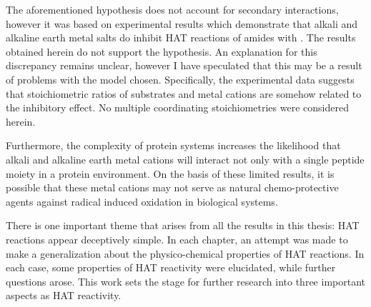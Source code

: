 \begin{doublespace}
The aforementioned hypothesis does not account for secondary interactions,
however it was based on experimental results which demonstrate that alkali and
alkaline earth metal salts do inhibit HAT reactions of amides with \cumo. The
results obtained herein do not support the hypothesis. An explanation for this
discrepancy remains unclear, however I have speculated that this may be a result
of problems with the model chosen. Specifically, the experimental data suggests
that stoichiometric ratios of substrates and metal cations are somehow related
to the inhibitory effect. No multiple coordinating stoichiometries were
considered herein.

Furthermore, the complexity of protein systems increases the likelihood that
alkali and alkaline earth metal cations will interact not only with a single
peptide moiety in a protein environment. On the basis of these limited results,
it is possible that these metal cations may not serve as natural
chemo-protective agents against radical induced oxidation in biological systems.

There is one important theme that arises from all the results in this thesis:
HAT reactions appear deceptively simple. In each chapter, an attempt was made to
make a generalization about the physico-chemical properties of HAT reactions. In
each case, some properties of HAT reactivity were elucidated, while further
questions arose. This work sets the stage for further research into three
important aspects as HAT reactivity.


\end{doublespace}
